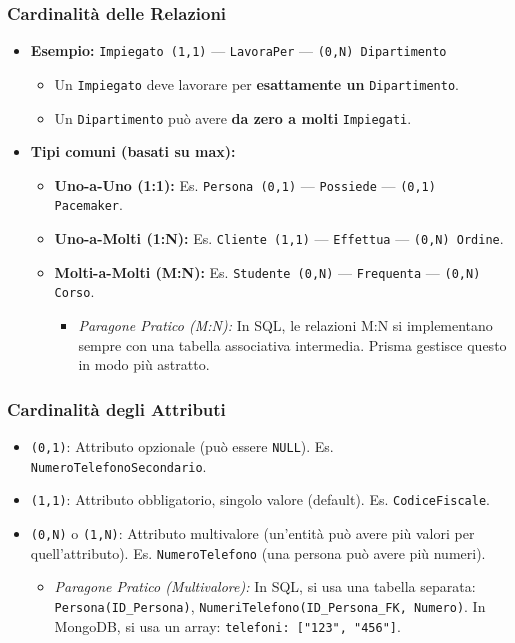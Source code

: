\documentclass{article}
\begin{document}
	\subsubsection{Cardinalità delle Relazioni}
	\begin{itemize}
		\item \textbf{Esempio:} \texttt{Impiegato (1,1)} --- \texttt{LavoraPer} --- \texttt{(0,N) Dipartimento}
		\begin{itemize}
			\item Un \texttt{Impiegato} deve lavorare per \textbf{esattamente un} \texttt{Dipartimento}.
			\item Un \texttt{Dipartimento} può avere \textbf{da zero a molti} \texttt{Impiegati}.
		\end{itemize}
		\item \textbf{Tipi comuni (basati su max):}
		\begin{itemize}
			\item \textbf{Uno-a-Uno (1:1):} Es. \texttt{Persona (0,1)} --- \texttt{Possiede} --- \texttt{(0,1) Pacemaker}.
			\item \textbf{Uno-a-Molti (1:N):} Es. \texttt{Cliente (1,1)} --- \texttt{Effettua} --- \texttt{(0,N) Ordine}.
			\item \textbf{Molti-a-Molti (M:N):} Es. \texttt{Studente (0,N)} --- \texttt{Frequenta} --- \texttt{(0,N) Corso}.
			\begin{itemize}
				\item \textit{Paragone Pratico (M:N):} In SQL, le relazioni M:N si implementano sempre con una tabella associativa intermedia. Prisma gestisce questo in modo più astratto.
			\end{itemize}
		\end{itemize}
	\end{itemize}
	
	\subsubsection{Cardinalità degli Attributi}
	\begin{itemize}
		\item \texttt{(0,1)}: Attributo opzionale (può essere \texttt{NULL}). Es. \texttt{NumeroTelefonoSecondario}.
		\item \texttt{(1,1)}: Attributo obbligatorio, singolo valore (default). Es. \texttt{CodiceFiscale}.
		\item \texttt{(0,N)} o \texttt{(1,N)}: Attributo multivalore (un'entità può avere più valori per quell'attributo). Es. \texttt{NumeroTelefono} (una persona può avere più numeri).
		\begin{itemize}
			\item \textit{Paragone Pratico (Multivalore):} In SQL, si usa una tabella separata: \texttt{Persona(ID\_Persona)}, \texttt{NumeriTelefono(ID\_Persona\_FK, Numero)}. In MongoDB, si usa un array: \texttt{telefoni: ["123", "456"]}.
		\end{itemize}
	\end{itemize}
	
\end{document}
